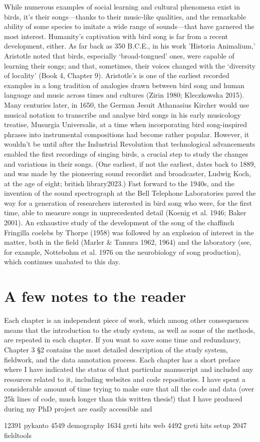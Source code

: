 While numerous examples of social learning and cultural phenomena exist in birds, it's their songs---thanks to their music-like qualities, and the remarkable ability of some species to imitate a wide range of sounds---that have garnered the most interest. Humanity’s captivation with bird song is far from a recent development, either. As far back as 350 B.C.E., in his work 'Historia Animalium,' Aristotle noted that birds, especially ‘broad-tongued’ ones, were capable of learning their songs; and that, sometimes, their voices changed with the ‘diversity of locality’ (Book 4, Chapter 9). Aristotle’s is one of the earliest recorded examples in a long tradition of analogies drawn between bird song and human language and music across times and cultures (Zirin 1980; Kleczkowska 2015).
Many centuries later, in 1650, the German Jesuit Athanasius Kircher would use musical notation to transcribe and analyse bird songs in his early musicology treatise, Musurgia Universalis, at a time when incorporating bird song-inspired phrases into instrumental compositions had become rather popular. However, it wouldn't be until after the Industrial Revolution that technological advancements enabled the first recordings of singing birds, a crucial step to study the changes and variations in their songs. (One earliest, if not the earliest, dates back to 1889, and was made by the pioneering sound recordist and broadcaster, Ludwig Koch, at the age of eight; british library2023.) Fast forward to the 1940s, and the invention of the sound spectrograph at the Bell Telephone Laboratories paved the way for a generation of researchers interested in bird song who were, for the first time, able to measure songs in unprecedented detail (Koenig et al. 1946; Baker 2001). An exhaustive study of the development of the song of the chaffinch Fringilla coelebs by Thorpe (1958) was followed by an explosion of interest in the matter, both in the field (Marler \& Tamura 1962, 1964) and the laboratory (see, for example, Nottebohm et al. 1976 on the neurobiology of song production), which continues unabated to this day. 







\section{A few notes to the reader}
Each chapter is an independent piece of work, which among other consequences means that the introduction to the study system, as well as some of the methods, are repeated in each chapter. If you want to save some time and redundancy, Chapter 3 §2 contains the most detailed description of the study system, fieldwork, and the data annotation process. Each chapter has a short preface where I have indicated the status of that particular manuscript and included any resources related to it, including websites and code repositories. I have spent a considerable amount of time trying to make sure that all the code and data (over 25k lines of code, much longer than this written thesis!) that I have produced during my PhD project are easily accessible and 

12391 pykanto
4549 demography
1634 greti hits web
4492 greti hits setup
2047 fieldtools
